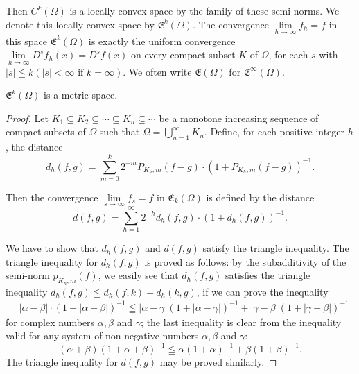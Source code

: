 Then $C^k(\Omega)$ is a locally convex space by the family of these semi-norms. We denote this locally convex space by $\mathfrak{E}^k(\Omega)$. The convergence $\lim\limits_{h\to \infty}f_h = f$ in this space $\mathfrak{E}^k(\Omega)$ is exactly the uniform convergence $\lim\limits_{h\to \infty}D^s f_h(x) = D^s f(x)$ on every compact subset $K$ of $\Omega$, for each $s$ with $|s| \leqq k (|s| < \infty \text{ if } k = \infty)$. We often write $\mathfrak{E}(\Omega)$ for $\mathfrak{E}^\infty (\Omega)$. 

\begin{proposition}\label{prop:I.1.Proposition.6} $\mathfrak{E}^k (\Omega)$ is a metric space. 
\end{proposition}

\begin{proof}
 Let $K_{1} \subseteq K_{2} \subseteq \cdots \subseteq K_{n} \subseteq \cdots$ be a monotone increasing sequence of compact subsets of $\Omega$ such that $\Omega = \bigcup\limits_{n=1}^{\infty} K_{n}$. Define, for each positive integer $h$, the distance 
\[
d_{h} (f, g) = \sum\limits_{m=0} ^{k} 2 ^{-m} P_ {K_{h}, m} (f- g) \cdot (1 + P_ {K_{h}, m} (f- g)) ^{-1}. \]

Then the convergence $\lim\limits_{s\to \infty}f_s = f$ in $\mathfrak{E}_k(\Omega)$ is defined by the distance 
\[
d (f, g) = \sum\limits_{h=1} ^{\infty} 2 ^{-h} d_{h} (f, g) \cdot (1 + d_{h} (f, g)) ^{-1}.
\]

We have to show that $d_h(f, g)$ and $d(f, g)$ satisfy the triangle inequality. The triangle inequality for $d_h(f, g)$ is proved as follows: by the subadditivity of the semi-norm $p_{K_h,m}(f)$, we easily see that $d_h(f, g)$ satisfies the triangle inequality $d_h(f, g) \leqq d_h(f, k) + d_h(k, g)$, if we can prove the inequality 
\[
\begin{aligned}
&| \alpha- \beta | \cdot (1 + | \alpha- \beta |) ^{-1}  \leqq | \alpha- \gamma | (1 + | \alpha- \gamma |) ^{-1} + | \gamma- \beta | (1 + | \gamma- \beta |) ^{-1}
\end{aligned}
\]
for complex numbers $\alpha, \beta$ and $\gamma$; the last inequality is clear from the inequality valid for any system of non-negative numbers $\alpha, \beta$ and $\gamma$: 
\[
(\alpha + \beta) (1 + \alpha + \beta) ^{-1} \leqq \alpha (1 + \alpha) ^{-1} + \beta (1 + \beta) ^{-1}.
\]
The triangle inequality for $d(f, g)$ may be proved similarly. 
\end{proof}

